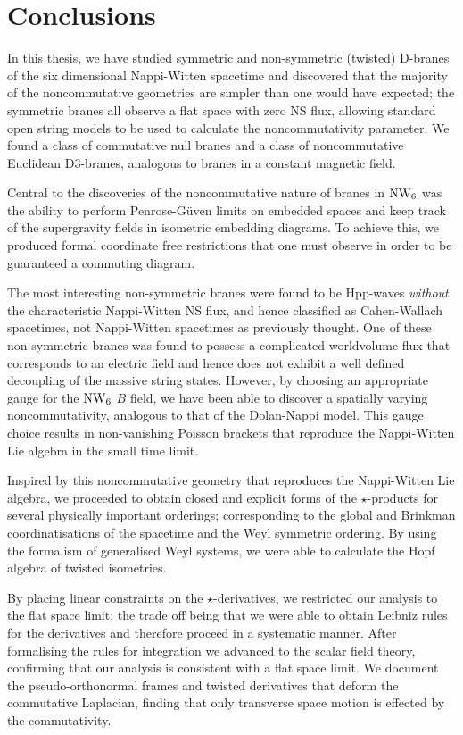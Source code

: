 \chapter{Conclusions}
\label{conclusion}

In this thesis, we have studied symmetric and non-symmetric (twisted) D-branes
of the six dimensional Nappi-Witten spacetime and discovered that the majority
of the noncommutative geometries are simpler than one would have expected; the
symmetric branes all observe a flat space with zero NS flux, allowing standard
open string models to be used to calculate the noncommutativity parameter. We
found a class of commutative null branes and a class of noncommutative Euclidean
D3-branes, analogous to branes in a constant magnetic field.

Central to the discoveries of the noncommutative nature of branes in $\operatorname{NW}_6$ was
the ability to perform Penrose-G\"uven limits on embedded spaces and keep track
of the supergravity fields in isometric embedding diagrams. To achieve this, we
produced formal coordinate free restrictions that one must observe in order to
be guaranteed a commuting diagram.

The most interesting non-symmetric branes were found to be Hpp-waves
\textit{without} the characteristic Nappi-Witten NS flux, and hence classified
as Cahen-Wallach spacetimes, not Nappi-Witten spacetimes as previously thought.
One of these non-symmetric branes was found to possess a complicated worldvolume
flux that corresponds to an electric field and hence does not exhibit a well
defined decoupling of the massive string states. However, by choosing an
appropriate gauge for the $\operatorname{NW}_6$ $B$ field, we have been able to discover a
spatially varying noncommutativity, analogous to that of the Dolan-Nappi model.
This gauge choice results in non-vanishing Poisson brackets that reproduce the
Nappi-Witten Lie algebra in the small time limit.

Inspired by this noncommutative geometry that reproduces the Nappi-Witten Lie
algebra, we proceeded to obtain closed and explicit forms of the
$\star$-products for several physically important orderings; corresponding to
the global and Brinkman coordinatisations of the spacetime and the Weyl
symmetric ordering. By using the formalism of generalised Weyl systems, we were
able to calculate the Hopf algebra of twisted isometries.

By placing linear constraints on the $\star$-derivatives, we restricted our
analysis to the flat space limit; the trade off being that we were able to
obtain Leibniz rules for the derivatives and therefore proceed in a systematic
manner. After formalising the rules for integration we advanced to the scalar
field theory, confirming that our analysis is consistent with a flat space
limit. We document the pseudo-orthonormal frames and twisted derivatives that
deform the commutative Laplacian, finding that only transverse space motion is
effected by the commutativity.

